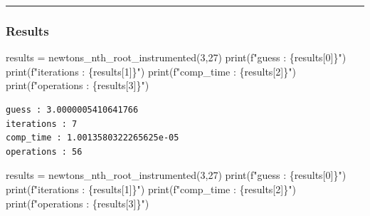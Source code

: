 \documentclass[
  letterpaper,
  DIV=11,
  numbers=noendperiod]{scrartcl}
\newenvironment{Shaded}{\begin{snugshade}}{\end{snugshade}}
\newcommand{\BuiltInTok}[1]{\textcolor[rgb]{0.00,0.23,0.31}{#1}}
\newcommand{\DecValTok}[1]{\textcolor[rgb]{0.68,0.00,0.00}{#1}}
\newcommand{\NormalTok}[1]{\textcolor[rgb]{0.00,0.23,0.31}{#1}}
\newcommand{\OperatorTok}[1]{\textcolor[rgb]{0.37,0.37,0.37}{#1}}
\newcommand{\SpecialCharTok}[1]{\textcolor[rgb]{0.37,0.37,0.37}{#1}}
\newcommand{\SpecialStringTok}[1]{\textcolor[rgb]{0.13,0.47,0.30}{#1}}
\begin{document}
\begin{center}\rule{0.5\linewidth}{0.5pt}\end{center}

\subsubsection{Results}\label{results}

\begin{Shaded}
\begin{Highlighting}[]
\NormalTok{results }\OperatorTok{=}\NormalTok{ newtons\_nth\_root\_instrumented(}\DecValTok{3}\NormalTok{,}\DecValTok{27}\NormalTok{)}
\BuiltInTok{print}\NormalTok{(}\SpecialStringTok{f"guess : }\SpecialCharTok{\{}\NormalTok{results[}\DecValTok{0}\NormalTok{]}\SpecialCharTok{\}}\SpecialStringTok{"}\NormalTok{)}
\BuiltInTok{print}\NormalTok{(}\SpecialStringTok{f"iterations : }\SpecialCharTok{\{}\NormalTok{results[}\DecValTok{1}\NormalTok{]}\SpecialCharTok{\}}\SpecialStringTok{"}\NormalTok{)}
\BuiltInTok{print}\NormalTok{(}\SpecialStringTok{f"comp\_time : }\SpecialCharTok{\{}\NormalTok{results[}\DecValTok{2}\NormalTok{]}\SpecialCharTok{\}}\SpecialStringTok{"}\NormalTok{)}
\BuiltInTok{print}\NormalTok{(}\SpecialStringTok{f"operations : }\SpecialCharTok{\{}\NormalTok{results[}\DecValTok{3}\NormalTok{]}\SpecialCharTok{\}}\SpecialStringTok{"}\NormalTok{)}
\end{Highlighting}
\end{Shaded}

\begin{verbatim}
guess : 3.0000005410641766
iterations : 7
comp_time : 1.0013580322265625e-05
operations : 56
\end{verbatim}

\begin{Shaded}
\begin{Highlighting}[]
\NormalTok{results }\OperatorTok{=}\NormalTok{ newtons\_nth\_root\_instrumented(}\DecValTok{3}\NormalTok{,}\DecValTok{27}\NormalTok{)}
\BuiltInTok{print}\NormalTok{(}\SpecialStringTok{f"guess : }\SpecialCharTok{\{}\NormalTok{results[}\DecValTok{0}\NormalTok{]}\SpecialCharTok{\}}\SpecialStringTok{"}\NormalTok{)}
\BuiltInTok{print}\NormalTok{(}\SpecialStringTok{f"iterations : }\SpecialCharTok{\{}\NormalTok{results[}\DecValTok{1}\NormalTok{]}\SpecialCharTok{\}}\SpecialStringTok{"}\NormalTok{)}
\BuiltInTok{print}\NormalTok{(}\SpecialStringTok{f"comp\_time : }\SpecialCharTok{\{}\NormalTok{results[}\DecValTok{2}\NormalTok{]}\SpecialCharTok{\}}\SpecialStringTok{"}\NormalTok{)}
\BuiltInTok{print}\NormalTok{(}\SpecialStringTok{f"operations : }\SpecialCharTok{\{}\NormalTok{results[}\DecValTok{3}\NormalTok{]}\SpecialCharTok{\}}\SpecialStringTok{"}\NormalTok{)}
\end{Highlighting}
\end{Shaded}
\end{document}
